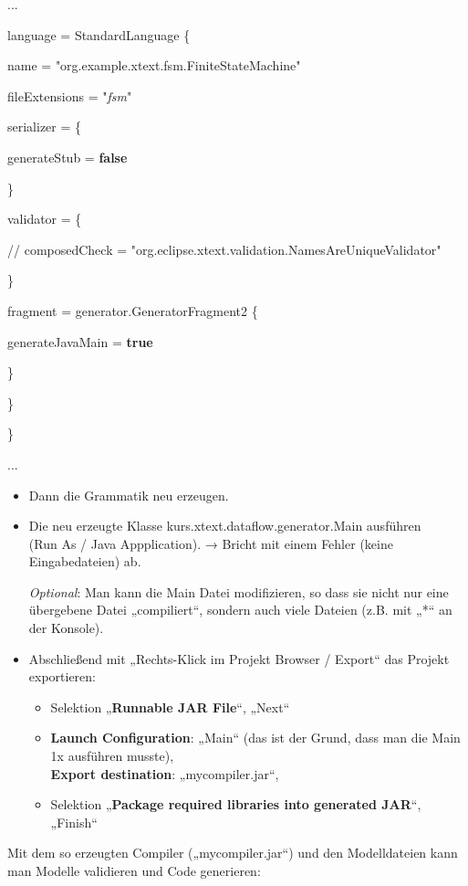 \documentclass[a4]{article}
\providecommand{\tightlist}{%
  \setlength{\itemsep}{0pt}\setlength{\parskip}{0pt}}
\begin{document}
...

language = StandardLanguage \{

name = "org.example.xtext.fsm.FiniteStateMachine"

fileExtensions = "\emph{fsm}"

serializer = \{

generateStub = \textbf{false}

\}

validator = \{

// composedCheck =
"org.eclipse.xtext.validation.NamesAreUniqueValidator"

\}

fragment = generator.GeneratorFragment2 \{

generateJavaMain = \textbf{true}

\}

\}

\}

...

\begin{itemize}
\item
  Dann die Grammatik neu erzeugen.
\item
  Die neu erzeugte Klasse kurs.xtext.dataflow.generator.Main ausführen\\
  (Run As / Java Appplication). → Bricht mit einem Fehler (keine
  Eingabedateien) ab.

  \emph{Optional}: Man kann die Main Datei modifizieren, so dass sie
  nicht nur eine übergebene Datei „compiliert``, sondern auch viele
  Dateien (z.B. mit „*`` an der Konsole).
\item
  Abschließend mit „Rechts-Klick im Projekt Browser / Export`` das
  Projekt exportieren:

  \begin{itemize}
  \tightlist
  \item
    Selektion „\textbf{Runnable JAR File}``, „Next``
  \item
    \textbf{Launch Configuration}: „Main`` (das ist der Grund, dass man
    die Main 1x ausführen musste),\\
    \textbf{Export destination}: „mycompiler.jar``, 
  \item
    Selektion „\textbf{Package required libraries into generated JAR}``,
    „Finish``
  \end{itemize}
\end{itemize}

Mit dem so erzeugten Compiler („mycompiler.jar``) und den Modelldateien
kann man Modelle validieren und Code generieren:
\end{document}
